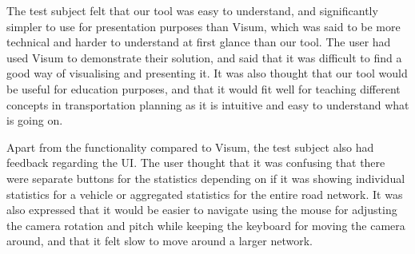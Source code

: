         The test subject felt that our tool was easy to understand, and significantly simpler to use for presentation purposes than Visum, which was said to be more technical and harder to understand at first glance than our tool. The user had used Visum to demonstrate their solution, and said that it was difficult to find a good way of visualising and presenting it. It was also thought that our tool would be useful for education purposes, and that it would fit well for teaching different concepts in transportation planning as it is intuitive and easy to understand what is going on.

        Apart from the functionality compared to Visum, the test subject also had feedback regarding the UI. The user thought that it was confusing that there were separate buttons for the statistics depending on if it was showing individual statistics for a vehicle or aggregated statistics for the entire road network. It was also expressed that it would be easier to navigate using the mouse for adjusting the camera rotation and pitch while keeping the keyboard for moving the camera around, and that it felt slow to move around a larger network.
